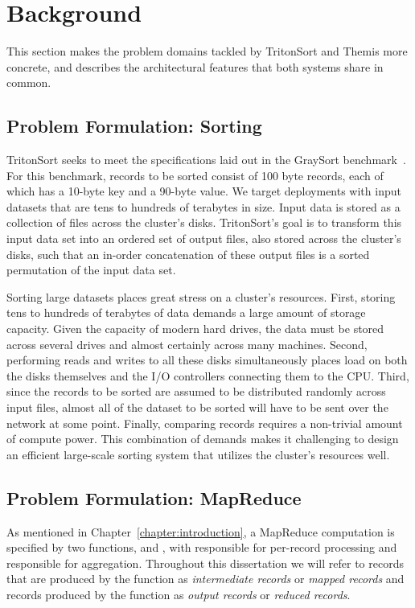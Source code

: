 \chapter{Background}
\label{chapter:background}

This section makes the problem domains tackled by TritonSort and Themis more
concrete, and describes the architectural features that both systems share in
common.

\section{Problem Formulation: Sorting}

TritonSort seeks to meet the specifications laid out in the GraySort
benchmark~\cite{terasort}. For this benchmark, records to be sorted consist of
100 byte records, each of which has a 10-byte key and a 90-byte value. We
target deployments with input datasets that are tens to hundreds of terabytes
in size. Input data is stored as a collection of files across the cluster's
disks. TritonSort's goal is to transform this input data set into an ordered
set of output files, also stored across the cluster's disks, such that an
in-order concatenation of these output files is a sorted permutation of the
input data set.

Sorting large datasets places great stress on a cluster's resources.  First,
storing tens to hundreds of terabytes of data demands a large amount of storage
capacity. Given the capacity of modern hard drives, the data must be stored
across several drives and almost certainly across many machines. Second,
performing reads and writes to all these disks simultaneously places load on
both the disks themselves and the I/O controllers connecting them to the
CPU. Third, since the records to be sorted are assumed to be distributed
randomly across input files, almost all of the dataset to be sorted will have
to be sent over the network at some point. Finally, comparing records requires
a non-trivial amount of compute power. This combination of demands makes it
challenging to design an efficient large-scale sorting system that utilizes the
cluster's resources well.

\section{Problem Formulation: MapReduce}

As mentioned in Chapter~\ref{chapter:introduction}, a MapReduce computation is
specified by two functions, \map and \reduce, with \map responsible for
per-record processing and \reduce responsible for aggregation. Throughout this
dissertation we will refer to records that are produced by the \map function as
\emph{intermediate records} or \emph{mapped records} and records produced by
the \reduce function as \emph{output records} or \emph{reduced records}.

